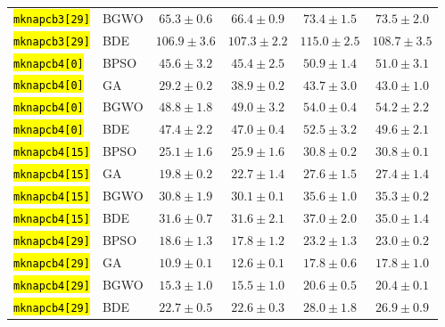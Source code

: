 \documentclass[mathematics,article,accept,moreauthors]{Definitions/mdpi}
\begin{document}
\begin{table}[H]
\begin{tabularx}{\textwidth}{XLCCCC}
    \texttt{\hl{mknapcb3[29]}} & BGWO  &  $\mathbf{65.3 \pm 0.6}$ &           $66.4 \pm 0.9$ &           $73.4 \pm 1.5$ &           $73.5 \pm 2.0$ \\
    \texttt{\hl{mknapcb3[29]}} & BDE   & $\mathbf{106.9 \pm 3.6}$ &          $107.3 \pm 2.2$ &          $115.0 \pm 2.5$ &          $108.7 \pm 3.5$ \\
    \midrule
    \texttt{\hl{mknapcb4[0]}} & BPSO  &           $45.6 \pm 3.2$ &  $\mathbf{45.4 \pm 2.5}$ &           $50.9 \pm 1.4$ &           $51.0 \pm 3.1$ \\
    \texttt{\hl{mknapcb4[0]}} & GA    &  $\mathbf{29.2 \pm 0.2}$ &           $38.9 \pm 0.2$ &           $43.7 \pm 3.0$ &           $43.0 \pm 1.0$ \\
    \texttt{\hl{mknapcb4[0]}} & BGWO  &  $\mathbf{48.8 \pm 1.8}$ &           $49.0 \pm 3.2$ &           $54.0 \pm 0.4$ &           $54.2 \pm 2.2$ \\
    \texttt{\hl{mknapcb4[0]}} & BDE   &           $47.4 \pm 2.2$ &  $\mathbf{47.0 \pm 0.4}$ &           $52.5 \pm 3.2$ &           $49.6 \pm 2.1$ \\
    \midrule
    \texttt{\hl{mknapcb4[15]}} & BPSO  &  $\mathbf{25.1 \pm 1.6}$ &           $25.9 \pm 1.6$ &           $30.8 \pm 0.2$ &           $30.8 \pm 0.1$ \\
    \texttt{\hl{mknapcb4[15]}} & GA    &  $\mathbf{19.8 \pm 0.2}$ &           $22.7 \pm 1.4$ &           $27.6 \pm 1.5$ &           $27.4 \pm 1.4$ \\
    \texttt{\hl{mknapcb4[15]}} & BGWO  &           $30.8 \pm 1.9$ &  $\mathbf{30.1 \pm 0.1}$ &           $35.6 \pm 1.0$ &           $35.3 \pm 0.2$ \\
    \texttt{\hl{mknapcb4[15]}} & BDE   &  $\mathbf{31.6 \pm 0.7}$ &           $31.6 \pm 2.1$ &           $37.0 \pm 2.0$ &           $35.0 \pm 1.4$ \\
    \midrule
    \texttt{\hl{mknapcb4[29]}} & BPSO  &           $18.6 \pm 1.3$ &  $\mathbf{17.8 \pm 1.2}$ &           $23.2 \pm 1.3$ &           $23.0 \pm 0.2$ \\
    \texttt{\hl{mknapcb4[29]}} & GA    &  $\mathbf{10.9 \pm 0.1}$ &           $12.6 \pm 0.1$ &           $17.8 \pm 0.6$ &           $17.8 \pm 1.0$ \\
    \texttt{\hl{mknapcb4[29]}} & BGWO  &  $\mathbf{15.3 \pm 1.0}$ &           $15.5 \pm 1.0$ &           $20.6 \pm 0.5$ &           $20.4 \pm 0.1$ \\
    \texttt{\hl{mknapcb4[29]}} & BDE   &           $22.7 \pm 0.5$ &  $\mathbf{22.6 \pm 0.3}$ &           $28.0 \pm 1.8$ &           $26.9 \pm 0.9$ \\

\end{tabularx}
\end{table}
\end{document}
